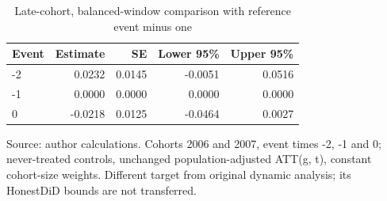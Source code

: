 \begin{table}[htbp]
\centering
\footnotesize
\caption{Late-cohort, balanced-window comparison with reference event minus one}
\begin{tabularx}{\linewidth}{Xrrrr}
\toprule
Event & Estimate & SE & Lower 95\% & Upper 95\% \\
\midrule
-2 & 0.0232 & 0.0145 & -0.0051 & 0.0516 \\
-1 & 0.0000 & 0.0000 & 0.0000 & 0.0000 \\
0 & -0.0218 & 0.0125 & -0.0464 & 0.0027 \\
\bottomrule
\end{tabularx}
\par\vspace{3pt}\begin{minipage}{\linewidth}\footnotesize Source: author calculations.\allowbreak{} Cohorts 2006 and 2007, event times -2, -1 and 0; never-treated controls, unchanged population-adjusted ATT(g, t), constant cohort-size weights.\allowbreak{} Different target from original dynamic analysis; its HonestDiD bounds are not transferred.\allowbreak{}\end{minipage}
\end{table}
